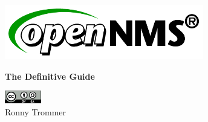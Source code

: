 %
%
%
%

\begin{titlepage}
    \begin{center}
        \includegraphics[width=0.65\textwidth]{images/opennms-logo.png}
    \end{center}
    \vspace{8em}
    \center
    \Huge{\textbf{The Definitive Guide}}
    \vspace{15em}

    \begin{flushright}
        \includegraphics[width=0.12\textwidth]{images/by-sa.png}
        \\
        \tiny{Ronny Trommer}
    \end{flushright}
\end{titlepage}